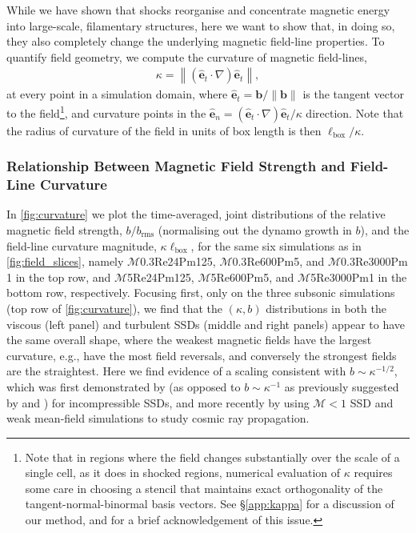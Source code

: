 \documentclass[12pt,twoside]{extreport}
\newcommand{\rbrac}[1]{\left( #1 \right)} %
\newcommand{\nbrac}[1]{\left\| #1 \right\|} %
\newcommand{\mVector}[1]{\bm{#1}} %
\newcommand{\mVectorBase}[1]{\hat{\mVector{e}}_{#1}} %
\newcommand{\mReh}{\ensuremath{\mathrm{Re}}} %
\newcommand{\mPrm}{\ensuremath{\mathrm{Pm}}} %
\newcommand{\mSonicMach}{\ensuremath{\mathcal{M}}} %
\newcommand{\eg}{e.g.,\xspace} %
\newcommand{\SimName}[3]{$\mSonicMach${#1}$\mReh${#2}$\mPrm${#3}}
\begin{document}
While we have shown that shocks reorganise and concentrate magnetic energy into large-scale, filamentary structures, here we want to show that, in doing so, they also completely change the underlying magnetic field-line properties. To quantify field geometry, we compute the curvature of magnetic field-lines,
\begin{align}
    \kappa
        = \nbrac{ \rbrac{\mVectorBase{t}\cdot\nabla}\mVectorBase{t} }
        , \label{eqn:kappa}
\end{align}
at every point in a simulation domain, where $\mVectorBase{t} = \mVector{b}/\|\mVector{b}\|$ is the tangent vector to the field\footnote{
    Note that in regions where the field changes substantially over the scale of a single cell, as it does in shocked regions, numerical evaluation of $\kappa$ requires some care in choosing a stencil that maintains exact orthogonality of the tangent-normal-binormal basis vectors. See \S\ref{app:kappa} for a discussion of our method, and \citet{schekochihin2004simulations} for a brief acknowledgement of this issue.
}, and curvature points in the $\mVectorBase{n} = (\mVectorBase{t}\cdot\nabla)\mVectorBase{t} / \kappa$ direction. Note that the radius of curvature of the field in units of box length is then $\ell_\mathrm{box}/\kappa$.

\subsubsection{Relationship Between Magnetic Field Strength and Field-Line Curvature}

In \autoref{fig:curvature} we plot the time-averaged, joint distributions of the relative magnetic field strength, $b/b_\mathrm{rms}$ (normalising out the dynamo growth in $b$), and the field-line curvature magnitude, $\kappa \ell_\mathrm{box}$, for the same six simulations as in \autoref{fig:field_slices}, namely \SimName{0.3}{24}{125}, \SimName{0.3}{600}{5}, and \SimName{0.3}{3000}{1} in the top row, and \SimName{5}{24}{125}, \SimName{5}{600}{5}, and \SimName{5}{3000}{1} in the bottom row, respectively. Focusing first, only on the three subsonic simulations (top row of \autoref{fig:curvature}), we find that the $(\kappa,b)$ distributions in both the viscous (left panel) and turbulent SSDs (middle and right panels) appear to have the same overall shape, where the weakest magnetic fields have the largest curvature, \eg have the most field reversals, and conversely the strongest fields are the straightest. Here we find evidence of a scaling consistent with $b \sim \kappa^{-1/2}$, which was first demonstrated by \citet{schekochihin2004simulations} (as opposed to $b \sim \kappa^{-1}$ as previously suggested by \citealt{brandenburg1995size} and \citealt{schekochihin2002small}) for incompressible SSDs, and more recently by \citet{kempski2023cosmic} using $\mSonicMach < 1$ SSD and weak mean-field simulations to study cosmic ray propagation.
\end{document}
